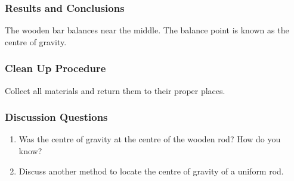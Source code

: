 \subsubsection*{Results and Conclusions}
The wooden bar balances near the middle. The balance point is known as the centre of gravity.  

\subsubsection*{Clean Up Procedure}
Collect all materials and return them to their proper places.

\subsubsection*{Discussion Questions}
\begin{enumerate}
\item{Was the centre of gravity at the centre of the wooden rod? How do you know?}
\item{Discuss another method to locate the centre of gravity of a uniform rod.} 
\end{enumerate}


